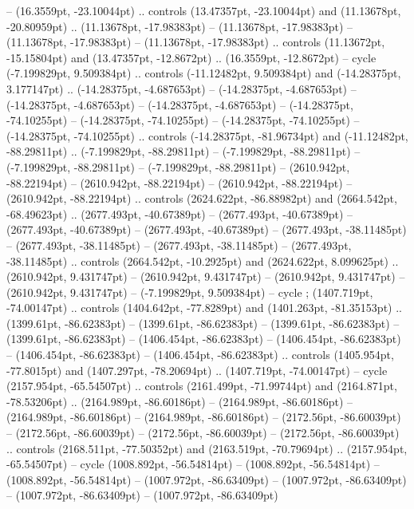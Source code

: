  -- (16.3559pt, -23.10044pt) .. controls (13.47357pt, -23.10044pt) and (11.13678pt, -20.80959pt) .. (11.13678pt, -17.98383pt)
 -- (11.13678pt, -17.98383pt)
 -- (11.13678pt, -17.98383pt)
 -- (11.13678pt, -17.98383pt) .. controls (11.13672pt, -15.15804pt) and (13.47357pt, -12.8672pt) .. (16.3559pt, -12.8672pt) -- cycle
(-7.199829pt, 9.509384pt) .. controls (-11.12482pt, 9.509384pt) and (-14.28375pt, 3.177147pt) .. (-14.28375pt, -4.687653pt)
 -- (-14.28375pt, -4.687653pt)
 -- (-14.28375pt, -4.687653pt)
 -- (-14.28375pt, -4.687653pt)
 -- (-14.28375pt, -74.10255pt)
 -- (-14.28375pt, -74.10255pt)
 -- (-14.28375pt, -74.10255pt)
 -- (-14.28375pt, -74.10255pt) .. controls (-14.28375pt, -81.96734pt) and (-11.12482pt, -88.29811pt) .. (-7.199829pt, -88.29811pt)
 -- (-7.199829pt, -88.29811pt)
 -- (-7.199829pt, -88.29811pt)
 -- (-7.199829pt, -88.29811pt)
 -- (2610.942pt, -88.22194pt)
 -- (2610.942pt, -88.22194pt)
 -- (2610.942pt, -88.22194pt)
 -- (2610.942pt, -88.22194pt) .. controls (2624.622pt, -86.88982pt) and (2664.542pt, -68.49623pt) .. (2677.493pt, -40.67389pt)
 -- (2677.493pt, -40.67389pt)
 -- (2677.493pt, -40.67389pt)
 -- (2677.493pt, -40.67389pt)
 -- (2677.493pt, -38.11485pt)
 -- (2677.493pt, -38.11485pt)
 -- (2677.493pt, -38.11485pt)
 -- (2677.493pt, -38.11485pt) .. controls (2664.542pt, -10.2925pt) and (2624.622pt, 8.099625pt) .. (2610.942pt, 9.431747pt)
 -- (2610.942pt, 9.431747pt)
 -- (2610.942pt, 9.431747pt)
 -- (2610.942pt, 9.431747pt)
 -- (-7.199829pt, 9.509384pt) -- cycle
;
(1407.719pt, -74.00147pt) .. controls (1404.642pt, -77.8289pt) and (1401.263pt, -81.35153pt) .. (1399.61pt, -86.62383pt)
 -- (1399.61pt, -86.62383pt)
 -- (1399.61pt, -86.62383pt)
 -- (1399.61pt, -86.62383pt)
 -- (1406.454pt, -86.62383pt)
 -- (1406.454pt, -86.62383pt)
 -- (1406.454pt, -86.62383pt)
 -- (1406.454pt, -86.62383pt) .. controls (1405.954pt, -77.8015pt) and (1407.297pt, -78.20694pt) .. (1407.719pt, -74.00147pt) -- cycle
(2157.954pt, -65.54507pt) .. controls (2161.499pt, -71.99744pt) and (2164.871pt, -78.53206pt) .. (2164.989pt, -86.60186pt)
 -- (2164.989pt, -86.60186pt)
 -- (2164.989pt, -86.60186pt)
 -- (2164.989pt, -86.60186pt)
 -- (2172.56pt, -86.60039pt)
 -- (2172.56pt, -86.60039pt)
 -- (2172.56pt, -86.60039pt)
 -- (2172.56pt, -86.60039pt) .. controls (2168.511pt, -77.50352pt) and (2163.519pt, -70.79694pt) .. (2157.954pt, -65.54507pt) -- cycle
(1008.892pt, -56.54814pt) -- (1008.892pt, -56.54814pt)
 -- (1008.892pt, -56.54814pt)
 -- (1007.972pt, -86.63409pt)
 -- (1007.972pt, -86.63409pt)
 -- (1007.972pt, -86.63409pt)
 -- (1007.972pt, -86.63409pt)

